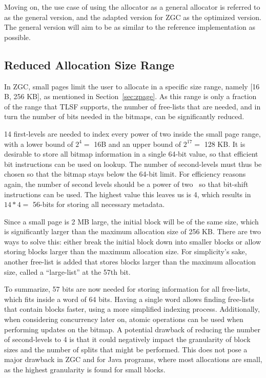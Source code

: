 Moving on, the use case of using the allocator as a general allocator is referred to as the general version, and the adapted version for ZGC as the optimized version. The general version will aim to be as similar to the reference implementation as possible.

\subsection{Reduced Allocation Size Range}
\label{sec:adaptations:reduced_allocation_range}

In ZGC, small pages limit the user to allocate in a specific size range, namely [16 B, 256 KB], as mentioned in Section~\ref{sec:zpage}. As this range is only a fraction of the range that TLSF supports, the number of free-lists that are needed, and in turn the number of bits needed in the bitmaps, can be significantly reduced.

14 first-levels are needed to index every power of two inside the small page range, with a lower bound of $2^4 =$ 16B and an upper bound of $2^{17} =$ 128 KB. It is desirable to store all bitmap information in a single 64-bit value, so that efficient bit instructions can be used on lookup. The number of second-levels must thus be chosen so that the bitmap stays below the 64-bit limit. For efficiency reasons again, the number of second levels should be a power of two~\cite{TLSF} so that bit-shift instructions can be used. The highest value this leaves us is 4, which results in $14 * 4 =$ 56-bits for storing all necessary metadata.

Since a small page is 2 MB large, the initial block will be of the same size, which is significantly larger than the maximum allocation size of 256 KB. There are two ways to solve this: either break the initial block down into smaller blocks or allow storing blocks larger than the maximum allocation size. For simplicity's sake, another free-list is added that stores blocks larger than the maximum allocation size, called a ``large-list'' at the 57th bit.

To summarize, 57 bits are now needed for storing information for all free-lists, which fits inside a word of 64 bits. Having a single word allows finding free-lists that contain blocks faster, using a more simplified indexing process. Additionally, when considering concurrency later on, atomic operations can be used when performing updates on the bitmap. A potential drawback of reducing the number of second-levels to 4 is that it could negatively impact the granularity of block sizes and the number of splits that might be performed. This does not pose a major drawback in ZGC and for Java programs, where most allocations are small, as the highest granularity is found for small blocks.

